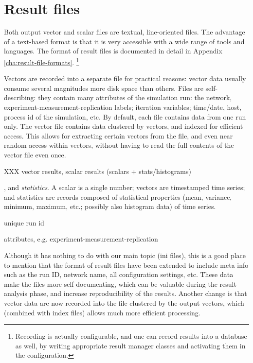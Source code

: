 \section{Result files}

Both output vector and scalar files are textual, line-oriented files.
The advantage of a text-based format is that it is very accessible
with a wide range of tools and languages. The format of result files is
documented in detail in Appendix \ref{cha:result-file-formats}.
  \footnote{Recording is actually configurable, and one can record
  results into a database as well, by writing appropriate result
  manager classes and activating them in the configuration.}

Vectors are recorded into a separate file for practical reasons: vector
data usually consume several magnitudes more disk space than others. Files
are self-describing: they contain many attributes of the simulation run:
the network, experiment-measurement-replication labels; iteration
variables; time/date, host, process id of the simulation, etc. By default,
each file contains data from one run only.
The vector file contains data clustered by vectors, and indexed for
efficient access. This allows for extracting certain vectors from the file,
and even near random access within vectors, without having to read the full
contents of the vector file even once.

XXX vector results, scalar results (scalars + stats/histograms)

, and \textit{statistics}. A scalar is a single number;
vectors are timestamped time series; and statistics are records composed of
statistical properties (mean, variance, minimum, maximum, etc.; possibly
also histogram data) of time series.

unique run id

attributes, e.g. experiment-measurement-replication

Although it has nothing to do with our main topic (ini files), this is a
good place to mention that the format of result files have been
extended to include meta info such as the run ID, network name, all
configuration settings, etc. These data make the files more
self-documenting, which can be valuable during the result analysis
phase, and increase reproducibility of the results. Another change is
that vector data are now recorded into the file clustered by the output
vectors, which (combined with index files) allows much more efficient
processing.



